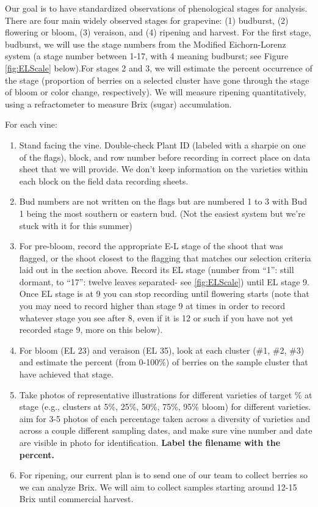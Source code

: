 \documentclass[11pt,letter]{article}
\begin{document}
Our goal is to have standardized observations of phenological stages for analysis. There are four main widely observed stages for grapevine: (1) budburst, (2) flowering or bloom, (3) veraison, and (4) ripening and harvest. For the first stage, budburst, we will use the stage numbers from the Modified Eichorn-Lorenz system (a stage number between 1-17, with 4 meaning budburst; see Figure \ref{fig:ELScale} below).For stages 2 and 3, we will estimate the percent occurrence of the stage (proportion of berries on a selected cluster have gone through the stage of bloom or color change, respectively). We will measure ripening quantitatively, using a refractometer to measure Brix (sugar) accumulation. 

For each vine:
\begin{enumerate}
	\item Stand facing the vine. Double-check Plant ID (labeled with a sharpie on one of the flags), block, and row number before recording in correct place on data sheet that we will provide. We don't keep information on the varieties within each block on the field data recording sheets.
	\item Bud numbers are not written on the flags but are numbered 1 to 3 with Bud 1 being the most southern or eastern bud. (Not the easiest system but we're stuck with it for this summer)
	\item For pre-bloom, record the appropriate E-L stage of the shoot that was flagged, or the shoot closest to the flagging that matches our selection criteria laid out in the section above. Record its EL stage (number from “1”: still dormant, to “17”: twelve leaves separated- see \ref{fig:ELScale}) until EL stage 9. Once EL stage is at 9 you can stop recording until flowering starts (note that you may need to record higher than stage 9 at times in order to record whatever stage you see after 8, even if it is 12 or such if you have not yet recorded stage 9, more on this below).
	\item  For bloom (EL 23) and veraison (EL 35), look at each cluster (\#1, \#2, \#3) and estimate the percent (from 0-100\%) of berries on the sample cluster that have achieved that stage. 
	\item Take photos of representative illustrations for different varieties of target \% at stage (e.g., clusters at 5\%, 25\%, 50\%, 75\%, 95\% bloom) for different varieties. aim for 3-5 photos of each percentage taken across a diversity of varieties and across a couple different sampling dates, and make sure vine number and date are visible in photo for identification. {\bf Label the filename with the percent.}
	\item For ripening, our current plan is to send one of our team to collect berries so we can analyze Brix. We will aim to collect samples starting around 12-15 Brix until commercial harvest. %

\end{enumerate}
\end{document}
